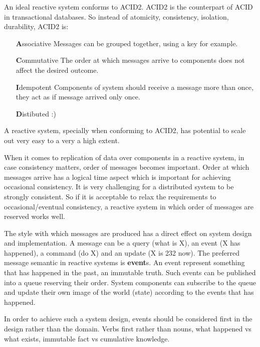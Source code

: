 \documentclass[a4]{report}
\begin{document}
        An ideal reactive system conforms to ACID2.
        ACID2 is the counterpart of ACID in transactional databases.
        So instead of atomicity, consistency, isolation, durability, ACID2 is:
        \begin{itemize}
            \item[\textbf{A}ssociative] Messages can be grouped together, using a key for example.
            \item[\textbf{C}ommutative] The order at which messages arrive to components does not affect the desired
            outcome.
            \item[\textbf{I}dempotent] Components of system should receive a message more than once, they act as if message
            arrived only once.
            \item[\textbf{D}istibuted] :)
        \end{itemize}

        A reactive system, specially when conforming to ACID2, has potential to scale out very easy to a very a high extent.

        When it comes to replication of data over components in a reactive system, in case consistency matters, order of
        messages becomes important.
        Order at which messages arrive has a logical time aspect which is important for achieving occasional consistency.
        It is very challenging for a distributed system to be strongly consistent.
        So if it is acceptable to relax the requirements to occasional/eventual consistency, a reactive system in which
        order of messages are reserved works well.

        The style with which messages are produced has a direct effect on system design and implementation.
        A message can be a query (what is X), an event (X has happened), a command (do X) and an update (X is 232 now).
        The preferred message semantic in reactive systems is \textbf{event}s.
        An event represent something that has happened in the past, an immutable truth.
        Such events can be published into a queue reserving their order.
        System components can subscribe to the queue and update their own image of the world (state) according to the
        events that has happened.

        In order to achieve such a system design, events should be considered first in the design rather than the domain.
        Verbs first rather than nouns, what happened vs what exists, immutable fact vs cumulative knowledge.
\end{document}
